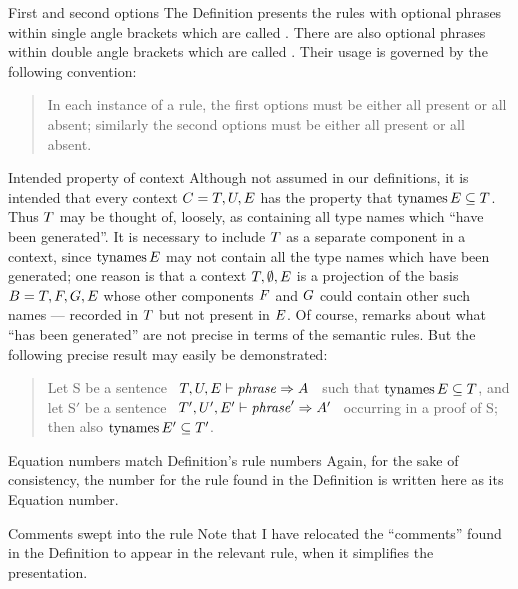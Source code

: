 \begin{convention}{First and second options}
The Definition presents the rules with optional phrases within single
angle brackets \optional{\ } which are called .
There are also optional phrases within double angle brackets
\optional{\optional{\ }} which are called . Their
usage is governed by the following convention:
\begin{quote}
In each instance of a rule, the first options must be either all present
or all absent; similarly the second options must be either all present
or all absent.
\end{quote}
\end{convention}

\begin{clause}{Intended property of context}
Although not assumed in our definitions, it is intended that every
context $C=T,U,E$ has the property that $\mathop{\rm tynames}\nolimits E\subseteq T$.
Thus $T$ may be thought of, loosely, as containing all type names
which ``have been generated''. It is necessary to include $T$ as a
separate component in a context, since $\mathop{\rm tynames}\nolimits E$ may not contain
all the type names which have been generated; one reason is that a
context $T,\emptyset,E$ is a projection of the basis $B=T,F,G,E$
whose other components $F$ and $G$
could contain other such names --- recorded in $T$ but not present in
$E$.  Of course, remarks about what ``has been generated'' are not
precise in terms of the semantic rules. But the following precise result
may easily be demonstrated:
\begin{quote}
Let S be a sentence ~$T,U,E\vdash{\it phrase}\Rightarrow A$~ such that
$\mathop{\rm tynames}\nolimits E\subseteq T$, and let S$'$ be a sentence
~$T',U',E'\vdash{\it phrase}'\Rightarrow A'$~ occurring in a proof of S; then
also $\mathop{\rm tynames}\nolimits E'\subseteq T'$.
\end{quote}
\end{clause}

\begin{remark}{Equation numbers match Definition's rule numbers}
Again, for the sake of consistency, the number for the rule found in the
Definition is written here as its Equation number.
\end{remark}

\begin{remark}{Comments swept into the rule}
Note that I have relocated the ``comments'' found in the Definition to
appear in the relevant rule, when it simplifies the presentation.
\end{remark}

